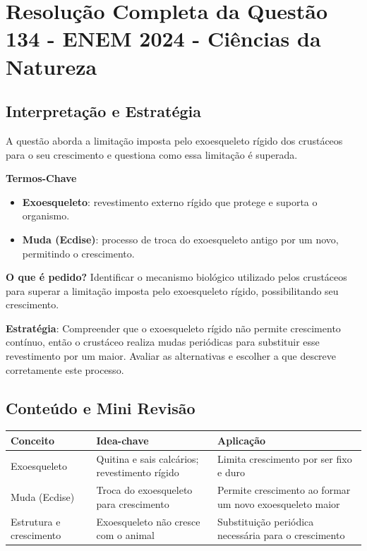 \documentclass{article}
\begin{document}
\section*{Resolução Completa da Questão 134 - ENEM 2024 - Ciências da Natureza}

\subsection*{Interpretação e Estratégia}
A questão aborda a limitação imposta pelo exoesqueleto rígido dos crustáceos para o seu crescimento e questiona como essa limitação é superada.

\textbf{Termos-Chave}
\begin{itemize}
  \item \textbf{Exoesqueleto}: revestimento externo rígido que protege e suporta o organismo.
  \item \textbf{Muda (Ecdise)}: processo de troca do exoesqueleto antigo por um novo, permitindo o crescimento.
\end{itemize}

\textbf{O que é pedido?} Identificar o mecanismo biológico utilizado pelos crustáceos para superar a limitação imposta pelo exoesqueleto rígido, possibilitando seu crescimento.

\textbf{Estratégia}: Compreender que o exoesqueleto rígido não permite crescimento contínuo, então o crustáceo realiza mudas periódicas para substituir esse revestimento por um maior. Avaliar as alternativas e escolher a que descreve corretamente este processo.

\subsection*{Conteúdo e Mini Revisão}
\begin{center}
\begin{tabular}{|p{4cm}|p{5cm}|p{5cm}|}
\hline
\textbf{Conceito} & \textbf{Idea-chave} & \textbf{Aplicação} \\
\hline
Exoesqueleto & Quitina e sais calcários; revestimento rígido & Limita crescimento por ser fixo e duro \\
\hline
Muda (Ecdise) & Troca do exoesqueleto para crescimento & Permite crescimento ao formar um novo exoesqueleto maior \\
\hline
Estrutura e crescimento & Exoesqueleto não cresce com o animal & Substituição periódica necessária para o crescimento \\
\hline
\end{tabular}
\end{center}
\end{document}
